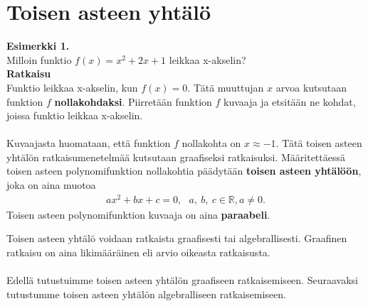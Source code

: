 \chapter{Toisen asteen yhtälö}
\textbf{Esimerkki 1.} \\
Milloin funktio $f(x)=x^2+2x+1$ leikkaa x-akselin? \\ 
\textbf{Ratkaisu} \\
Funktio leikkaa x-akselin, kun $f(x)=0$. Tätä muuttujan $x$ arvoa kutsutaan funktion $f$ \textbf{nollakohdaksi}. Piirretään funktion $f$ kuvaaja ja etsitään ne kohdat, joissa funktio leikkaa x-akselin. %
\\ \\
Kuvaajasta huomataan, että funktion $f$ nollakohta on $x \approx -1$. Tätä toisen asteen yhtälön ratkaisumenetelmää kutsutaan graafiseksi ratkaisuksi.
Määritettäessä toisen asteen polynomifunktion nollakohtia päädytään \textbf{toisen asteen yhtälöön}, joka on aina muotoa
\begin{align*}
ax^2+bx+c=0, \ \ \ a, \ b, \ c  \in \mathbb{R}, a \neq 0.
\end{align*}
Toisen asteen polynomifunktion kuvaaja on aina \textbf{paraabeli}. \\


Toisen asteen yhtälö voidaan ratkaista graafisesti tai algebrallisesti. Graafinen ratkaisu on aina likimääräinen eli arvio oikeasta ratkaisusta. \\ \\ Edellä tutustuimme toisen asteen yhtälön graafiseen ratkaisemiseen. Seuraavaksi tutustumme toisen asteen yhtälön algebralliseen ratkaisemiseen.
